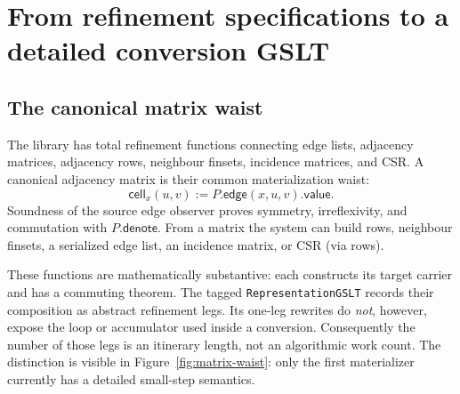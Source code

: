 \documentclass[11pt]{article}
\theoremstyle{remark}
\newcommand{\code}[1]{\texttt{#1}}
\begin{document}
\section{From refinement specifications to a detailed conversion GSLT}
\label{sec:static}

\subsection{The canonical matrix waist}

The library has total refinement functions connecting edge lists, adjacency
matrices, adjacency rows, neighbour finsets, incidence matrices, and CSR.  A
canonical adjacency matrix is their common materialization waist:
\[
  \mathsf{cell}_{x}(u,v)
    := P.\mathsf{edge}(x,u,v).\mathsf{value}.
\]
Soundness of the source edge observer proves symmetry, irreflexivity, and
commutation with \(P.\mathsf{denote}\).  From a matrix the system can build
rows, neighbour finsets, a serialized edge list, an incidence matrix, or CSR
(via rows).

These functions are mathematically substantive: each constructs its target
carrier and has a commuting theorem.  The tagged \code{RepresentationGSLT}
records their composition as abstract refinement legs.  Its one-leg rewrites
do \emph{not}, however, expose the loop or accumulator used inside a
conversion.  Consequently the number of those legs is an itinerary length,
not an algorithmic work count.  The distinction is visible in
Figure~\ref{fig:matrix-waist}: only the first materializer currently has a
detailed small-step semantics.
\end{document}
